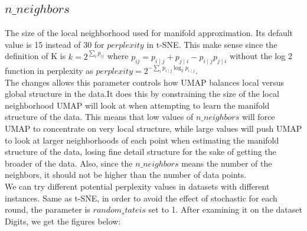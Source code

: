 \subsection{$n\_neighbors$}

The size of the local neighborhood used for manifold approximation.  Its default value is 15 instead of 30 for $perplexity$ in t-SNE. This make sense since the definition of K is $k = 2^{\sum_i p_{ij}}$ where $p_{ij} = p_{i\mid j} + p_{j\mid i} - p_{i\mid j}p_{j\mid i}$ without the log 2 function in perplexity as $perplexity = 2^{-\sum_i p_{i \mid j} \log_2 p_{i \mid j} }$. \\

\noindent The changes allows this parameter controls how UMAP balances local versus global structure in the data.It does this by constraining the size of the local neighborhood UMAP will look at when attempting to learn the manifold structure of the data. This means that low values of $n\_neighbors$ will force UMAP to concentrate on very local structure, while large values will push UMAP to look at larger neighborhoods of each point when estimating the manifold structure of the data, losing fine detail structure for the sake of getting the broader of the data. Also, since the $n\_neighbors$ means the number of the neighbors, it should not be higher than the number of data points.\\

\noindent We can try different potential perplexity values in datasets with different instances. Same as t-SNE, in order to avoid the effect of stochastic for each round, the parameter is $random_stateis$ set to 1. After examining it on the dataset Digits, we get the figures below:

